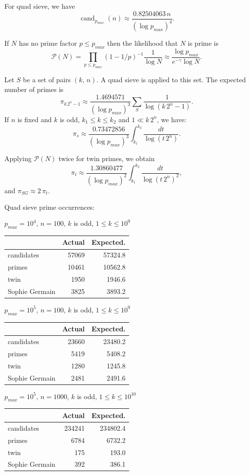 \documentclass[a4paper, 12pt]{article}
\DeclareMathOperator{\cand}{cand}
\newcommand\T{\rule{0pt}{2.6ex}}
\theoremstyle{plain}
\theoremstyle{definition}
\begin{document}
For quad sieve, we have
\[\cand_{p_{max}}(n) \approx \frac{0.82504063\, n}{\left(\log p_{max}\right)^4}.\]

\medskip
 
If $N$ has no prime factor $p \leq p_{max}$ then the likelihood that $N$ is prime is
\[\mathcal{P}(N) = \prod_{p \leq p_{max}} \left(1 - 1/p\right)^{-1} \frac{1}{\log N}
 \approx \frac{\log p_{max}}{e^{-\gamma} \log N}.\]

Let $S$ be a set of pairs $(k,\, n)$. A quad sieve is applied to this set. The expected
number of primes is
\[\pi_{k\,2^n - 1} \approx \frac{1.4694571}{\left(\log p_{max}\right)^3}
 \sum_S \frac{1}{\log(k\,2^n - 1)} .\]
If $n$ is fixed and $k$ is odd, $k_1 \leq k \leq k_2$ and $1 \ll k\,2^n$, we have:
\[\pi_s \approx \frac{0.73472856}{\left(\log p_{max}\right)^3}
 \int_{k_1}^{k_2} \frac{dt}{\log(t\,2^n)}.\]

Applying $\mathcal{P}(N)$ twice for twin primes, we obtain
\[\pi_t \approx \frac{1.30860477}{\left(\log p_{max}\right)^2}
 \int_{k_1}^{k_2} \frac{dt}{\log(t\,2^n)^2},\]
 and $\pi_{SG} \approx 2\,\pi_t$.

\begin{center}
Quad sieve prime occurrences:\\
\bigskip

$p_{max} = 10^4$, $n = 100$, $k$ is odd, $1 \leq k \leq 10^9$
\smallskip

\begin{tabular}{lrr}
 & Actual & Expected.\\
\hline \T
candidates & 57069 & 57324.8\\
primes & 10461 & 10562.8\\
twin & 1950 & 1946.6\\
Sophie Germain & 3825 & 3893.2
\end{tabular}
\bigskip

$p_{max} = 10^5$, $n = 100$, $k$ is odd, $1 \leq k \leq 10^9$
\smallskip

\begin{tabular}{lrr}
 & Actual & Expected.\\
\hline \T
candidates & 23660 & 23480.2\\
primes & 5419 & 5408.2\\
twin & 1280 & 1245.8\\
Sophie Germain & 2481 & 2491.6
\end{tabular}
\bigskip

$p_{max} = 10^5$, $n = 1000$, $k$ is odd, $1 \leq k \leq 10^{10}$
\smallskip

\begin{tabular}{lrr}
 & Actual & Expected.\\
\hline \T
candidates & 234241 & 234802.4\\
primes & 6784 & 6732.2\\
twin & 175 & 193.0\\
Sophie Germain &392 & 386.1
\end{tabular}
\bigskip

\end{center}
\end{document}

